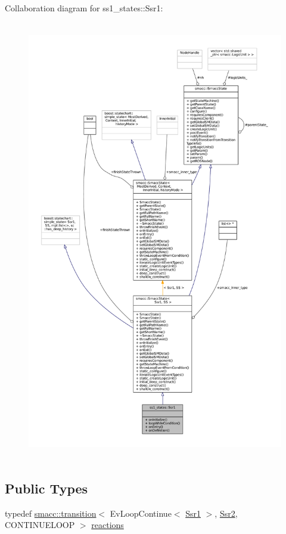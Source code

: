 Collaboration diagram for ss1\+\_\+states\+:\+:Ssr1\+:
\nopagebreak
\begin{figure}[H]
\begin{center}
\leavevmode
\includegraphics[height=550pt]{structss1__states_1_1Ssr1__coll__graph}
\end{center}
\end{figure}
\subsection*{Public Types}
\begin{DoxyCompactItemize}
\item 
typedef \hyperlink{classsmacc_1_1transition}{smacc\+::transition}$<$ Ev\+Loop\+Continue$<$ \hyperlink{structss1__states_1_1Ssr1}{Ssr1} $>$, \hyperlink{structss1__states_1_1Ssr2}{Ssr2}, C\+O\+N\+T\+I\+N\+U\+E\+L\+O\+OP $>$ \hyperlink{structss1__states_1_1Ssr1_ad19749148fafde686b74c4fc7c40d7f8}{reactions}
\end{DoxyCompactItemize}
